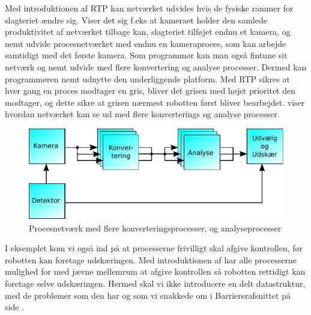 Med introduktionen af RTP kan netværket udvides hvis de fysiske rammer for slagteriet ændre sig. Viser det sig f.eks at kameraet holder den samlede produktivitet af netværket tilbage kan, slagteriet tilføjet endnu et kamera, og nemt udvide procesnetværket med endnu en kameraproces, som kan arbejde samtidigt med det første kamera. 
Som programmør kan man også fintune sit netværk og nemt udvide med flere konvertering og analyse processer. Dermed kan programmøren nemt udnytte den underliggende platform. Med RTP sikres at hver gang en proces modtager en gris, bliver det grisen med højst prioritet den modtager, og dette sikre at grisen nærmest robotten først bliver bearbejdet. 
 viser hvordan netværket kan se ud med flere konverterings og analyse processer. 

\begin{figure}
 \begin{center}
  \includegraphics[scale=1]{images/pig-network3}
	\caption{Procesnetværk med flere konverteringsprocesser, og analyseprocesser}
	\label{fig:pig-network3}
\end{center}
\end{figure}


I eksemplet kom vi også ind på at processerne frivilligt skal afgive kontrollen, før robotten kan foretage udskæringen. Med introduktionen af  har alle processerne  mulighed for med jævne mellemrum at afgive kontrollen så robotten rettidigt kan foretage selve udskæringen. Hermed skal vi ikke  introducere en delt datastruktur, med de problemer som den har og som vi snakkede om i Barriererafsnittet på side \pageref{sec:barrierer}.
 
